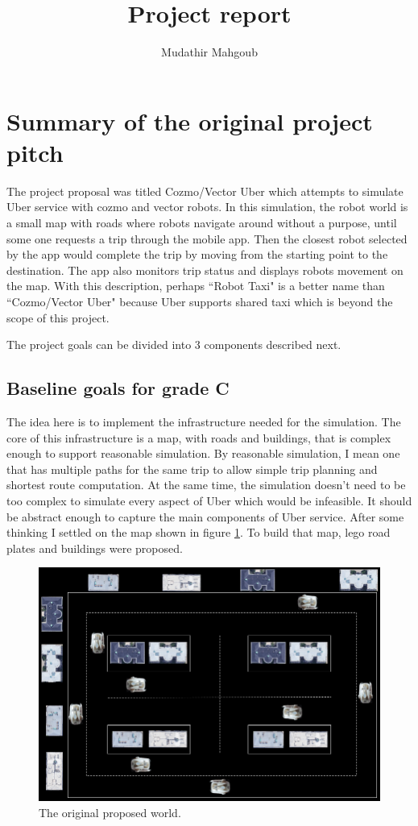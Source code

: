 \documentclass[12pt,a4paper]{article}
\author{Mudathir Mahgoub}
\title{Project report}
\begin{document}
\maketitle

\section{Summary of the original project pitch}

The project proposal was titled Cozmo/Vector Uber which attempts to simulate Uber service with cozmo and vector robots. In this simulation, the robot world is a small map with roads where robots navigate around without a purpose, until some one requests a trip through the mobile app. Then the closest robot selected by the app would complete the trip by moving from the starting point to the destination. The app also  monitors trip status and displays robots movement on the map.  With this description, perhaps ``Robot Taxi" is a better name than ``Cozmo/Vector Uber" because Uber supports shared taxi which is beyond the scope of this project.

The project goals can be divided into 3 components described next. 

\subsection{Baseline goals for grade C} \label{sec:C}
The idea here is to implement the infrastructure needed for the simulation. The core of this infrastructure is a map, with roads and buildings, that is complex enough to support reasonable simulation. By reasonable simulation, I mean one that has multiple paths for the same trip to allow simple trip planning and shortest route computation. At the same time, the simulation doesn't need to be too complex to simulate every aspect of Uber which would be infeasible. It should be abstract enough to capture the main components of Uber service. After some thinking I settled on the map shown in figure \ref{fig:proposedMap}. To build that map, lego road plates and buildings were proposed. 
\begin{figure}[H]
\center
\includegraphics[scale=0.5]{./original_map.png}
\caption{The original proposed world.} \label{fig:proposedMap} 
\end{figure}
\end{document}
